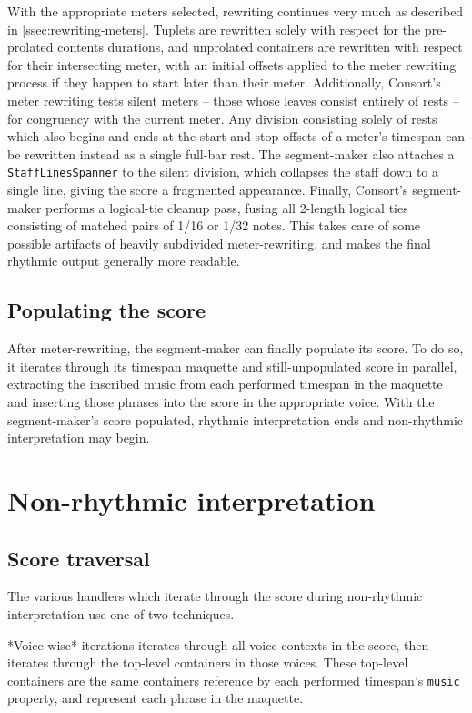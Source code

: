 \noindent With the appropriate meters selected, rewriting continues very much
as described in \autoref{ssec:rewriting-meters}. Tuplets are rewritten solely
with respect for the pre-prolated contents durations, and unprolated containers
are rewritten with respect for their intersecting meter, with an initial
offsets applied to the meter rewriting process if they happen to start later
than their meter. Additionally, Consort's meter rewriting tests silent meters
-- those whose leaves consist entirely of rests -- for congruency with the
current meter. Any division consisting solely of rests which also begins and
ends at the start and stop offsets of a meter's timespan can be rewritten
instead as a single full-bar rest. The segment-maker also attaches a
\texttt{StaffLinesSpanner} to the silent division, which collapses the staff
down to a single line, giving the score a fragmented appearance. Finally,
Consort's segment-maker performs a logical-tie cleanup pass, fusing all
2-length logical ties consisting of matched pairs of 1/16 or 1/32 notes. This
takes care of some possible artifacts of heavily subdivided meter-rewriting,
and makes the final rhythmic output generally more readable.

\subsection{Populating the score}
\label{ssec:populating-the-score}

After meter-rewriting, the segment-maker can finally populate its score. To do
so, it iterates through its timespan maquette and still-unpopulated score in
parallel, extracting the inscribed music from each performed timespan in the
maquette and inserting those phrases into the score in the appropriate voice.
With the segment-maker's score populated, rhythmic interpretation ends and
non-rhythmic interpretation may begin.

\section{Non-rhythmic interpretation}

\subsection{Score traversal}

The various handlers which iterate through the score during non-rhythmic
interpretation use one of two techniques.

*Voice-wise* iterations iterates through all voice contexts in the score, then
iterates through the top-level containers in those voices. These top-level
containers are the same containers reference by each performed timespan's
\texttt{music} property, and represent each phrase in the maquette.

